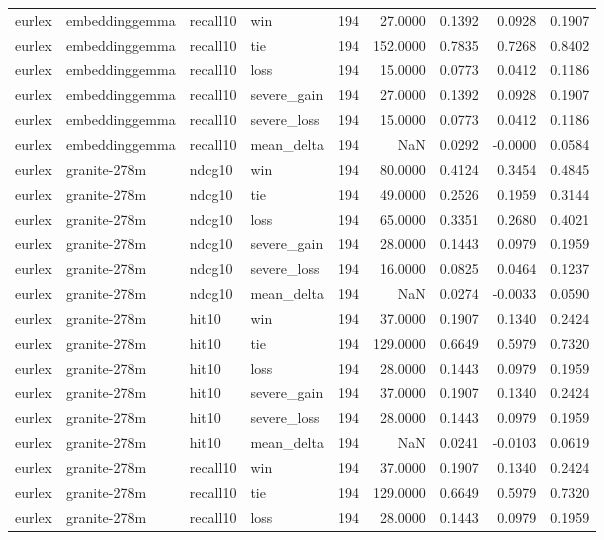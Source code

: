 \begin{tabular}{llllrrrrr}
eurlex & embeddinggemma & recall10 & win & 194 & 27.0000 & 0.1392 & 0.0928 & 0.1907 \\
eurlex & embeddinggemma & recall10 & tie & 194 & 152.0000 & 0.7835 & 0.7268 & 0.8402 \\
eurlex & embeddinggemma & recall10 & loss & 194 & 15.0000 & 0.0773 & 0.0412 & 0.1186 \\
eurlex & embeddinggemma & recall10 & severe\_gain & 194 & 27.0000 & 0.1392 & 0.0928 & 0.1907 \\
eurlex & embeddinggemma & recall10 & severe\_loss & 194 & 15.0000 & 0.0773 & 0.0412 & 0.1186 \\
eurlex & embeddinggemma & recall10 & mean\_delta & 194 & NaN & 0.0292 & -0.0000 & 0.0584 \\
eurlex & granite-278m & ndcg10 & win & 194 & 80.0000 & 0.4124 & 0.3454 & 0.4845 \\
eurlex & granite-278m & ndcg10 & tie & 194 & 49.0000 & 0.2526 & 0.1959 & 0.3144 \\
eurlex & granite-278m & ndcg10 & loss & 194 & 65.0000 & 0.3351 & 0.2680 & 0.4021 \\
eurlex & granite-278m & ndcg10 & severe\_gain & 194 & 28.0000 & 0.1443 & 0.0979 & 0.1959 \\
eurlex & granite-278m & ndcg10 & severe\_loss & 194 & 16.0000 & 0.0825 & 0.0464 & 0.1237 \\
eurlex & granite-278m & ndcg10 & mean\_delta & 194 & NaN & 0.0274 & -0.0033 & 0.0590 \\
eurlex & granite-278m & hit10 & win & 194 & 37.0000 & 0.1907 & 0.1340 & 0.2424 \\
eurlex & granite-278m & hit10 & tie & 194 & 129.0000 & 0.6649 & 0.5979 & 0.7320 \\
eurlex & granite-278m & hit10 & loss & 194 & 28.0000 & 0.1443 & 0.0979 & 0.1959 \\
eurlex & granite-278m & hit10 & severe\_gain & 194 & 37.0000 & 0.1907 & 0.1340 & 0.2424 \\
eurlex & granite-278m & hit10 & severe\_loss & 194 & 28.0000 & 0.1443 & 0.0979 & 0.1959 \\
eurlex & granite-278m & hit10 & mean\_delta & 194 & NaN & 0.0241 & -0.0103 & 0.0619 \\
eurlex & granite-278m & recall10 & win & 194 & 37.0000 & 0.1907 & 0.1340 & 0.2424 \\
eurlex & granite-278m & recall10 & tie & 194 & 129.0000 & 0.6649 & 0.5979 & 0.7320 \\
eurlex & granite-278m & recall10 & loss & 194 & 28.0000 & 0.1443 & 0.0979 & 0.1959 \\

\end{tabular}
